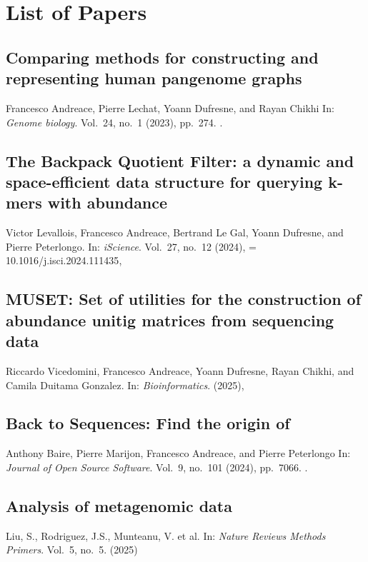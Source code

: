 \chapter{List of Papers}


\section*{Comparing methods for constructing and representing human pangenome graphs}
Francesco Andreace, Pierre Lechat, Yoann Dufresne, and Rayan Chikhi
In: \emph{Genome biology}.
Vol.\ 24,
no.\ 1
(2023),
pp.~274.
.

\section*{The Backpack Quotient Filter: a dynamic and space-efficient data structure for querying k-mers with abundance}
Victor Levallois, Francesco Andreace, Bertrand Le Gal, Yoann Dufresne, and Pierre Peterlongo.
In: \emph{iScience}.
Vol.\ 27,
no.\ 12
(2024),
\doi = {10.1016/j.isci.2024.111435},



\section*{MUSET: Set of utilities for the construction of abundance unitig matrices from sequencing data}
Riccardo Vicedomini, Francesco Andreace, Yoann Dufresne, Rayan Chikhi, and Camila Duitama Gonzalez.
In: \emph{Bioinformatics}.
(2025),


\section*{Back to Sequences: Find the origin of \kmers}
Anthony Baire, Pierre Marijon, Francesco Andreace, and Pierre
Peterlongo 
In: \emph{Journal of Open Source Software}.
Vol.\ 9,
no.\ 101
(2024),
pp.~7066.
.


\section*{Analysis of metagenomic data}
Liu, S., Rodriguez, J.S., Munteanu, V. et al.
In: \emph{Nature Reviews Methods Primers}.
Vol.\ 5,
no.\ 5.
(2025)



